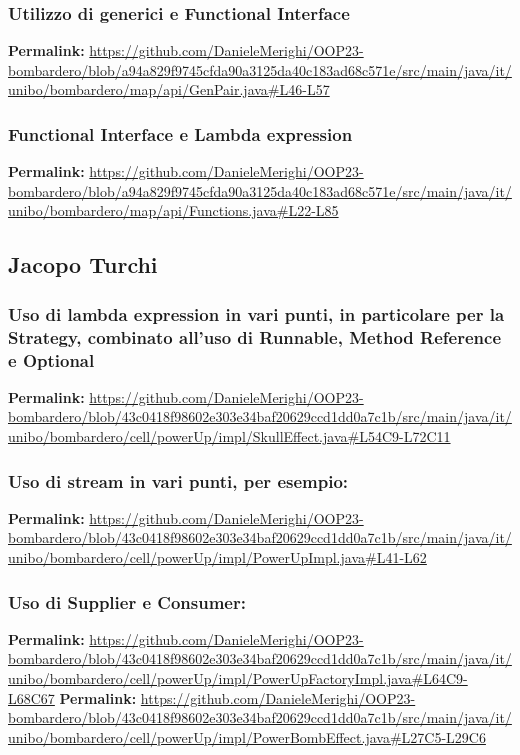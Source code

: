 \documentclass[a4paper,12pt]{report}
\begin{document}
\subsubsection{Utilizzo di generici e Functional Interface}
\textbf{Permalink:} \url{https://github.com/DanieleMerighi/OOP23-bombardero/blob/a94a829f9745cfda90a3125da40c183ad68c571e/src/main/java/it/unibo/bombardero/map/api/GenPair.java#L46-L57}

\subsubsection{Functional Interface e Lambda expression}
\textbf{Permalink:} \url{https://github.com/DanieleMerighi/OOP23-bombardero/blob/a94a829f9745cfda90a3125da40c183ad68c571e/src/main/java/it/unibo/bombardero/map/api/Functions.java#L22-L85}

\subsection{Jacopo Turchi}

\subsubsection{Uso di lambda expression in vari punti, in particolare per la Strategy, combinato all'uso di Runnable, Method Reference e Optional}
\textbf{Permalink:} \url{https://github.com/DanieleMerighi/OOP23-bombardero/blob/43c0418f98602e303e34baf20629ccd1dd0a7c1b/src/main/java/it/unibo/bombardero/cell/powerUp/impl/SkullEffect.java#L54C9-L72C11}

\subsubsection{Uso di stream in vari punti, per esempio:}
\textbf{Permalink:} \url{https://github.com/DanieleMerighi/OOP23-bombardero/blob/43c0418f98602e303e34baf20629ccd1dd0a7c1b/src/main/java/it/unibo/bombardero/cell/powerUp/impl/PowerUpImpl.java#L41-L62}

\subsubsection{Uso di Supplier e Consumer:}
\textbf{Permalink:} \url{https://github.com/DanieleMerighi/OOP23-bombardero/blob/43c0418f98602e303e34baf20629ccd1dd0a7c1b/src/main/java/it/unibo/bombardero/cell/powerUp/impl/PowerUpFactoryImpl.java#L64C9-L68C67}
\textbf{Permalink:} \url{https://github.com/DanieleMerighi/OOP23-bombardero/blob/43c0418f98602e303e34baf20629ccd1dd0a7c1b/src/main/java/it/unibo/bombardero/cell/powerUp/impl/PowerBombEffect.java#L27C5-L29C6}
\end{document}

